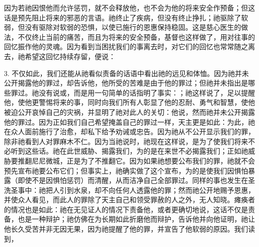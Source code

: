 因为若祂因恨他而允许惩罚，就不会释放他，也不会为他的将来安全作预备；但这话是预先阻止将来的邪恶的言语。祂终止了疾病，但没有终止挣扎；祂驱除了软弱，但没有驱除对软弱的恐惧，以使已施行的恩惠保持稳固。这是慈心医生的做法，不仅终止当前的痛苦，而且为将来的安全预备，基督也这样做了，用对往事的回忆振作他的灵魂。因为看到当困扰我们的事离去时，对它们的回忆也常常随之离去，祂希望这回忆持续存留，便说：\par

3. 不仅如此，我们还能从祂看似责备的话语中看出祂的远见和体恤。因为祂并未公开揭露他的罪过，却告诉他，他所受的苦难是由于他的罪过；但祂并未指出是哪些罪过。祂没有说或，而是用一句简单的话指明了事实：；祂这样说了，足以提醒他，使他更警惕将来的事，同时向我们所有人彰显了他的忍耐、勇气和智慧，使他被迫公开哀悼自己的灾祸，并显明了祂对此人的关切：他说，然而祂并未公开揭露他的罪过。因为正如我们自己希望掩盖自己的罪过一样，天主更是如此：为此，祂在众人面前施行了治愈，却私下给予劝诫或忠告。因为祂从不公开显示我们的罪，除非祂看到人对罪麻木不仁。因为当祂说时，祂现在这样说，是为了使我们将来不必听到这些话。祂在此世威胁、揭露我们，为的是在来世不必揭露我们；正如祂威胁要推翻尼尼微城，正是为了不推翻它。因为如果祂想要公布我们的罪，祂就不会预先宣布祂要公布它们；但事实上，祂确实做了这个宣布，为的是使我们因惧怕暴露（即使不是因惧怕惩罚）而清醒，从而洁净自己全部罪过。同样的事也发生在圣洗圣事中：祂把人引到水泉，却不向任何人透露他的罪；然而祂公开地赐予恩惠，并使众人看见，而此人的罪除了天主自己和领受罪赦的人之外，无人知晓。瘫痪者的情况也是如此：祂在无见证人的情况下责备他，或者更确切地说，这话不仅是责备，也是一种辩护；祂仿佛在为长期如此折磨他而辩护，告诉他并向他证明，祂让他长久受苦并非无因无果，因为祂提醒了他的罪，并宣告了他软弱的原因。我们读到，\par

